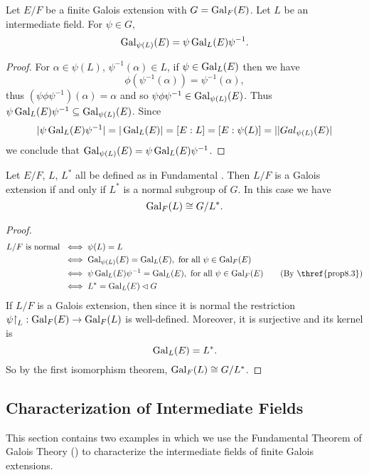 \documentclass[11pt]{article}
\begin{document}
\begin{proposition}
    Let $E/F$ be a finite Galois extension with $G=\operatorname{Gal}_F(E)$. Let $L$ be an intermediate field. For $\psi\in G$,
    \[\operatorname{Gal}_{\psi(L)}(E)=\psi\operatorname{Gal}_L(E)\psi^{-1}.\]
\end{proposition}

\begin{proof}
    For $\alpha\in\psi(L)$, $\psi^{-1}(\alpha)\in L$, if $\psi\in\operatorname{Gal}_L(E)$ then we have
    \[\phi(\psi^{-1}(\alpha))=\psi^{-1}(\alpha),\]
    thus $(\psi\phi\psi^{-1})(\alpha)=\alpha$ and so $\psi\phi\psi^{-1}\in\operatorname{Gal}_{\psi(L)}(E)$. Thus $\psi\operatorname{Gal}_L(E)\psi^{-1}\subseteq\operatorname{Gal}_{\psi(L)}(E)$. Since 
    \[|\psi\operatorname{Gal}_L(E)\psi^{-1}|=|\operatorname{Gal}_L(E)|=[E:L]=[E:\psi(L)]=||Gal_{\psi(L)}(E)|\]
    we conclude that $\operatorname{Gal}_{\psi(L)}(E)=\psi\operatorname{Gal}_L(E)\psi^{-1}$.
    
\end{proof}

\begin{theorem}
    Let $E/F$, $L$, $L^*$ all be defined as in Fundamental . Then $L/F$ is a Galois extension if and only if $L^*$ is a normal subgroup of $G$. In this case we have
    \[\operatorname{Gal}_F(L)\cong G/L^*.\]
\end{theorem}

\begin{proof}
    \begin{align*}
        L/F\text{ is normal }&\iff\psi(L)=L \\
        &\iff\Gal_{\psi(L)}(E)=\Gal_L(E),\text{ for all }\psi\in\Gal_F(E) \\
        &\iff\psi\Gal_L(E)\psi^{-1}=\Gal_L(E),\text{ for all }\psi\in\Gal_F(E)\tag{By \thref{prop8.3}} \\
        &\iff L^*=\Gal_L(E)\lhd G
    \end{align*}
    If $L/F$ is a Galois extension, then since it is normal the restriction $\psi{\upharpoonright}_L:\operatorname{Gal}_F(E)\to\operatorname{Gal}_F(L)$ is well-defined. Moreover, it is surjective and its kernel is
    \[\operatorname{Gal}_L(E)=L^*.\]
    So by the first isomorphism theorem, $\operatorname{Gal}_F(L)\cong G/L^*$.
    
\end{proof}

\subsection{Characterization of Intermediate Fields}

This section contains two examples in which we use the Fundamental Theorem of Galois Theory () to characterize the intermediate fields of finite Galois extensions.
\end{document}
